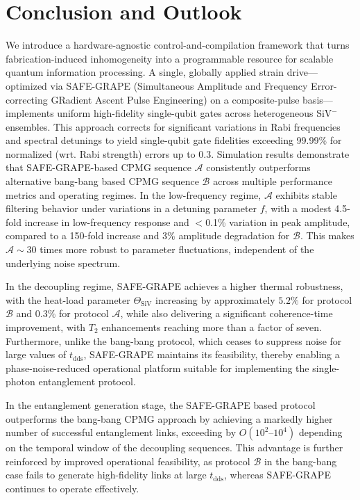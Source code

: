 \documentclass[%
 reprint,
 superscriptaddress,
 amsmath,amssymb,
 aps,
 prx,
]{revtex4-2}
\begin{document}
\section{Conclusion and Outlook}

We introduce a hardware-agnostic control-and-compilation framework that turns fabrication-induced inhomogeneity into a programmable resource for scalable quantum information processing. A single, globally applied strain drive—optimized via SAFE-GRAPE (Simultaneous Amplitude and Frequency Error-correcting GRadient Ascent Pulse Engineering) on a composite-pulse basis—implements uniform high-fidelity single-qubit gates across heterogeneous SiV$^{-}$ ensembles. This approach corrects for significant variations in Rabi frequencies and spectral detunings to yield single-qubit gate fidelities exceeding 99.99\% for normalized (wrt. Rabi strength) errors up to 0.3. Simulation results demonstrate that SAFE-GRAPE-based CPMG sequence \( \mathcal{A} \) consistently outperforms alternative bang-bang based CPMG sequence \( \mathcal{B} \) across multiple performance metrics and operating regimes. In the low-frequency regime, \( \mathcal{A} \) exhibits stable filtering behavior under variations in a detuning parameter \(   f \), with a modest 4.5-fold increase in low-frequency response and $<$0.1\% variation in peak amplitude, compared to a 150-fold increase and 3\% amplitude degradation for \( \mathcal{B} \). This makes \( \mathcal{A}\sim 30 \) times more robust to parameter fluctuations, independent of the underlying noise spectrum.

In the decoupling regime, SAFE-GRAPE achieves a higher thermal robustness, with the heat-load parameter $\Theta_{\text{SiV}}$ increasing by approximately $5.2\%$ for protocol $\mathcal{B}$ and $0.3\%$ for protocol $\mathcal{A}$, while also delivering a significant coherence-time improvement, with $T_{2}$ enhancements reaching more than a factor of seven. Furthermore, unlike the bang-bang protocol, which ceases to suppress noise for large values of $t_{\text{dds}}$, SAFE-GRAPE maintains its feasibility, thereby enabling a phase-noise-reduced operational platform suitable for implementing the single-photon entanglement protocol.

In the entanglement generation stage, the SAFE-GRAPE based protocol outperforms the bang-bang CPMG approach by achieving a markedly higher number of successful entanglement links, exceeding by $O(10^2\text{--}10^4)$ depending on the temporal window of the decoupling sequences. This advantage is further reinforced by improved operational feasibility, as protocol $\mathcal{B}$ in the bang-bang case fails to generate high-fidelity links at large $t_{\text{dds}}$, whereas SAFE-GRAPE continues to operate effectively.  
\end{document}
